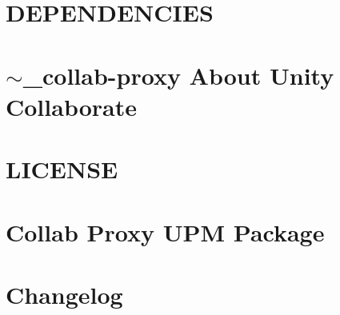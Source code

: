 \let\mypdfximage\pdfximage\def\pdfximage{\immediate\mypdfximage}\documentclass[twoside]{book}
\newcommand{\+}{\discretionary{\mbox{\scriptsize$\hookleftarrow$}}{}{}}
\begin{document}
\chapter{D\+E\+P\+E\+N\+D\+E\+N\+C\+I\+ES}
\label{md__o_1__git_h_u_b_m_i_n_i_p_roject__library__package_cache_com_8unity_8collab-proxy_0D1_82_815__d_e_p_e_n_d_e_n_c_i_e_s}

\chapter{$\sim$\+\_\+collab-\/proxy About Unity Collaborate}
\label{md__o_1__git_h_u_b_m_i_n_i_p_roject__library__package_cache_com_8unity_8collab-proxy_0D1_82_815__documentation}

\chapter{L\+I\+C\+E\+N\+SE}
\label{md__o_1__git_h_u_b_m_i_n_i_p_roject__library__package_cache_com_8unity_8collab-proxy_0D1_82_815__l_i_c_e_n_s_e}

\chapter{Collab Proxy U\+PM Package}
\label{md__o_1__git_h_u_b_m_i_n_i_p_roject__library__package_cache_com_8unity_8collab-proxy_0D1_82_815__r_e_a_d_m_e}

\chapter{Changelog}
\label{md__o_1__git_h_u_b_m_i_n_i_p_roject__library__package_cache_com_8unity_8package-manager-ui_0D2_80_87__c_h_a_n_g_e_l_o_g}

\end{document}
